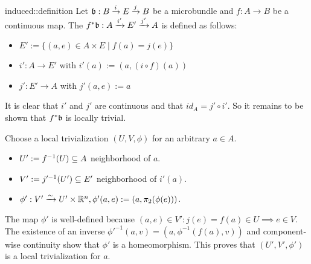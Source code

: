 \begin{mydefinition}{induced::definition}
    Let $\bb: \bundle{B}{E}{i}{j}$ be a microbundle and $f: A \to B$ be a continuous map.
    The  $\bundledef{f^*\bb}{A}{E'}{i'}{j'}$ is defined as follows:
    \begin{itemize}
        \item $E' := \{ (a, e) \in A \times E \mid f(a) = j(e) \}$
        \item $i': A \to E'$ with $i'(a) := (a, (i \circ f)(a))$
        \item $j': E' \to A$ with $j'(a, e) := a$
    \end{itemize}
\end{mydefinition}
\begin{myproof}
    It is clear that $i'$ and $j'$ are continuous and that $id_A = j' \circ i'$.
    So it remains to be shown that $f^*\bb$ is locally trivial.

    Choose a local trivialization $(U, V, \phi)$ for an arbitrary $a \in A$.
    \begin{itemize}
        \item $U' := f^{-1}(U) \sub A$ neighborhood of $a$.
        \item $V' := j'^{-1}(U') \sub E'$ neighborhood of $i'(a)$.
        \item $\phi': V' \isomto U' \times \R^n, \phi'(a, e) := (a, \pi_2(\phi(e)))$.
    \end{itemize}
    The map $\phi'$ is well-defined because $(a, e) \in V': j(e) = f(a) \in U \implies e \in V$.
    The existence of an inverse $\phi'^{-1}(a, v) = (a, \phi^{-1}(f(a), v))$ and component-wise continuity show that $\phi'$ is a homeomorphism.
    This proves that $(U', V', \phi')$ is a local trivialization for $a$. 
\end{myproof}